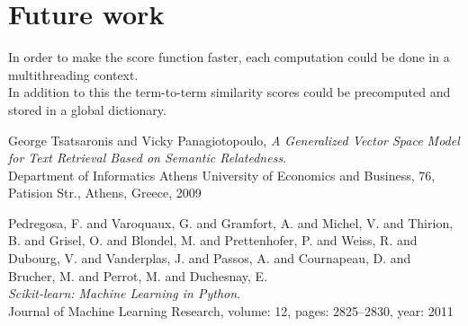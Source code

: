 \documentclass[twoside]{article}
\begin{document}
\section{Future work}
In order to make the score function faster, each computation could be done in a multithreading context.\\In addition to this the term-to-term similarity scores could be precomputed and stored in a global dictionary.
\begin{thebibliography}{999}

  George Tsatsaronis and Vicky Panagiotopoulo,
  \emph{ A Generalized Vector Space Model for Text Retrieval Based on Semantic Relatedness}.
  \\Department of Informatics Athens University of Economics and Business, 76, Patision Str., Athens, Greece,
  2009

  
  Pedregosa, F. and Varoquaux, G. and Gramfort, A. and Michel, V.
         and Thirion, B. and Grisel, O. and Blondel, M. and Prettenhofer, P.
         and Weiss, R. and Dubourg, V. and Vanderplas, J. and Passos, A. and
         Cournapeau, D. and Brucher, M. and Perrot, M. and Duchesnay, E.
  \emph{\\Scikit-learn: Machine Learning in {P}ython}.
  \\Journal of Machine Learning Research, volume: 12, pages: 2825--2830, year: 2011


\end{thebibliography}
\end{document}
